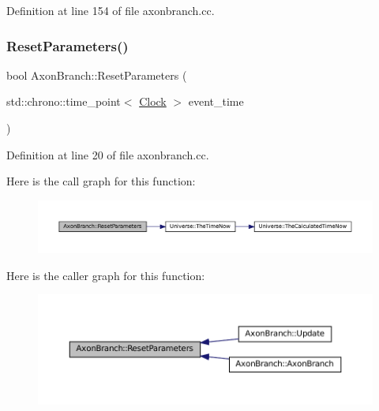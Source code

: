 Definition at line 154 of file axonbranch.\+cc.

\mbox{\label{class_axon_branch_a195d68dffd37317db3f94e1b4c8f73c7}} 
\subsubsection{\texorpdfstring{Reset\+Parameters()}{ResetParameters()}}
{\footnotesize\ttfamily bool Axon\+Branch\+::\+Reset\+Parameters (\begin{DoxyParamCaption}\item[{std\+::chrono\+::time\+\_\+point$<$ \mbox{\hyperlink{universe_8h_a0ef8d951d1ca5ab3cfaf7ab4c7a6fd80}{Clock}} $>$}]{event\+\_\+time }\end{DoxyParamCaption})}



Definition at line 20 of file axonbranch.\+cc.

Here is the call graph for this function\+:\nopagebreak
\begin{figure}[H]
\begin{center}
\leavevmode
\includegraphics[width=350pt]{class_axon_branch_a195d68dffd37317db3f94e1b4c8f73c7_cgraph}
\end{center}
\end{figure}
Here is the caller graph for this function\+:\nopagebreak
\begin{figure}[H]
\begin{center}
\leavevmode
\includegraphics[width=350pt]{class_axon_branch_a195d68dffd37317db3f94e1b4c8f73c7_icgraph}
\end{center}
\end{figure}
\mbox{\label{class_axon_branch_a96ba30b18627563d637d4e02fac943be}} 
